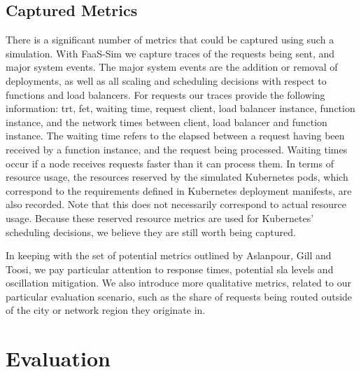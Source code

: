 \documentclass[draft,final]{vutinfth} %
\begin{document}
%
%
\section{Captured Metrics}
There is a significant number of metrics that could be captured using such a simulation. With FaaS-Sim we capture traces of the requests being sent, and major system events.
The major system events are the addition or removal of deployments, as well as all scaling and scheduling decisions with respect to functions and load balancers.
For requests our traces provide the following information: \gls{trt}, \gls{fet}, waiting time, request client, load balancer instance, function instance, and the network times between client, load balancer and function instance.
The waiting time refers to the elapsed between a request having been received by a function instance, and the request being processed.
Waiting times occur if a node receives requests faster than it can process them.
In terms of resource usage, the resources reserved by the simulated Kubernetes pods, which correspond to the requirements defined in Kubernetes deployment manifests, are also recorded.
Note that this does not necessarily correspond to actual resource usage.
Because these reserved resource metrics are used for Kubernetes' scheduling decisions, we believe they are still worth being captured.

In keeping with the set of potential metrics outlined by Aslanpour, Gill and Toosi\cite{aslanpourPerformanceEvaluationMetrics2020a}, we pay particular attention to response times, potential \gls{sla} levels and oscillation mitigation.
We also introduce more qualitative metrics, related to our particular evaluation scenario, such as the share of requests being routed outside of the city or network region they originate in.
\chapter{Evaluation}

\end{document}
